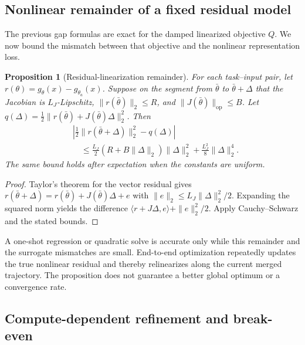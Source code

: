 \documentclass[letterpaper]{article} %
\theoremstyle{plain}
\newtheorem{proposition}[theorem]{Proposition}
\theoremstyle{definition}
\begin{document}
\subsection{Nonlinear remainder of a fixed residual model}
\label{app:nonlinear}

The previous gap formulas are exact for the damped linearized objective $Q$.
We now bound the mismatch between that objective and the nonlinear representation loss.

\begin{proposition}[Residual-linearization remainder]
\label{prop:nonlinear-remainder}
For each task--input pair, let $r(\theta)=g_\theta(x)-g_{\theta_a}(x)$.
Suppose on the segment from $\bar\theta$ to $\bar\theta+\Delta$ that the Jacobian is $L_J$-Lipschitz, $\|r(\bar\theta)\|_2\le R$, and $\|J(\bar\theta)\|_{\mathrm{op}}\le B$.
Let $q(\Delta)=\frac12\|r(\bar\theta)+J(\bar\theta)\Delta\|_2^2$.
Then
\begin{align}
&\left|
\frac12\|r(\bar\theta+\Delta)\|_2^2-q(\Delta)
\right| \\
&\quad\le
\frac{L_J}{2}(R+B\|\Delta\|_2)\|\Delta\|_2^2
+\frac{L_J^2}{8}\|\Delta\|_2^4.
\label{eq:nonlinear-remainder}
\end{align}
The same bound holds after expectation when the constants are uniform.
\end{proposition}

\begin{proof}
Taylor's theorem for the vector residual gives $r(\bar\theta+\Delta)=r(\bar\theta)+J(\bar\theta)\Delta+e$ with $\|e\|_2\le L_J\|\Delta\|_2^2/2$.
Expanding the squared norm yields the difference $\langle r+J\Delta,e\rangle+\|e\|_2^2/2$.
Apply Cauchy--Schwarz and the stated bounds.
\end{proof}

A one-shot regression or quadratic solve is accurate only while this remainder and the surrogate mismatches are small.
End-to-end optimization repeatedly updates the true nonlinear residual and thereby relinearizes along the current merged trajectory.
The proposition does not guarantee a better global optimum or a convergence rate.

\subsection{Compute-dependent refinement and break-even}
\label{app:compute-error}
\end{document}
